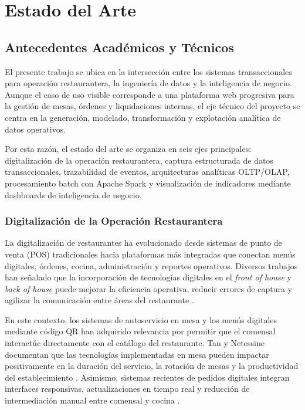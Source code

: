 \section{Estado del Arte}

\subsection{Antecedentes Acad\'emicos y T\'ecnicos}

El presente trabajo se ubica en la intersecci\'on entre los sistemas transaccionales
para operaci\'on restaurantera, la ingenier\'ia de datos y la inteligencia de negocio.
Aunque el caso de uso visible corresponde a una plataforma web progresiva para la
gesti\'on de mesas, \'ordenes y liquidaciones internas, el eje t\'ecnico del proyecto se
centra en la generaci\'on, modelado, transformaci\'on y explotaci\'on anal\'itica de datos
operativos.

Por esta raz\'on, el estado del arte se organiza en seis ejes principales:
digitalizaci\'on de la operaci\'on restaurantera, captura estructurada de datos
transaccionales, trazabilidad de eventos, arquitecturas anal\'iticas OLTP/OLAP,
procesamiento batch con Apache Spark y visualizaci\'on de indicadores mediante
dashboards de inteligencia de negocio.

\subsubsection{Digitalizaci\'on de la Operaci\'on Restaurantera}

La digitalizaci\'on de restaurantes ha evolucionado desde sistemas de punto de venta
(POS) tradicionales hacia plataformas m\'as integradas que conectan men\'us digitales,
\'ordenes, cocina, administraci\'on y reportes operativos. Diversos trabajos han se\~nalado
que la incorporaci\'on de tecnolog\'ias digitales en el \textit{front of house} y
\textit{back of house} puede mejorar la eficiencia operativa, reducir errores de
captura y agilizar la comunicaci\'on entre \'areas del restaurante
\cite{lee_digital_2024, tan_tabletop_2020, katagri_smart_2025}.

En este contexto, los sistemas de autoservicio en mesa y los men\'us digitales mediante
c\'odigo QR han adquirido relevancia por permitir que el comensal interact\'ue directamente
con el cat\'alogo del restaurante. Tan y Netessine documentan que las tecnolog\'ias
implementadas en mesa pueden impactar positivamente en la duraci\'on del servicio, la
rotaci\'on de mesas y la productividad del establecimiento \cite{tan_tabletop_2020}.
Asimismo, sistemas recientes de pedidos digitales integran interfaces responsivas,
actualizaciones en tiempo real y reducci\'on de intermediaci\'on manual entre comensal
y cocina \cite{katagri_smart_2025}.

